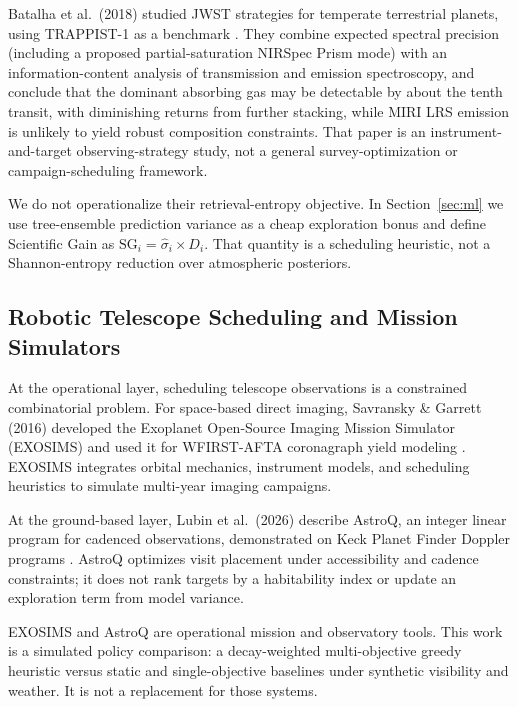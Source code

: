 \documentclass[11pt,a4paper]{article}
\begin{document}
Batalha et al.\ (2018) studied JWST strategies for temperate terrestrial planets, using TRAPPIST-1 as a benchmark \cite{batalha2018}. They combine expected spectral precision (including a proposed partial-saturation NIRSpec Prism mode) with an information-content analysis of transmission and emission spectroscopy, and conclude that the dominant absorbing gas may be detectable by about the tenth transit, with diminishing returns from further stacking, while MIRI LRS emission is unlikely to yield robust composition constraints. That paper is an instrument-and-target observing-strategy study, not a general survey-optimization or campaign-scheduling framework.

We do not operationalize their retrieval-entropy objective. In Section~\ref{sec:ml} we use tree-ensemble prediction variance as a cheap exploration bonus and define Scientific Gain as $\text{SG}_i = \hat{\sigma}_i \times D_i$. That quantity is a scheduling heuristic, not a Shannon-entropy reduction over atmospheric posteriors.

\subsection{Robotic Telescope Scheduling and Mission Simulators}

At the operational layer, scheduling telescope observations is a constrained combinatorial problem. For space-based direct imaging, Savransky \& Garrett (2016) developed the Exoplanet Open-Source Imaging Mission Simulator (EXOSIMS) and used it for WFIRST-AFTA coronagraph yield modeling \cite{savransky2016}. EXOSIMS integrates orbital mechanics, instrument models, and scheduling heuristics to simulate multi-year imaging campaigns.

At the ground-based layer, Lubin et al.\ (2026) describe AstroQ, an integer linear program for cadenced observations, demonstrated on Keck Planet Finder Doppler programs \cite{lubin2026astroq}. AstroQ optimizes visit placement under accessibility and cadence constraints; it does not rank targets by a habitability index or update an exploration term from model variance.

EXOSIMS and AstroQ are operational mission and observatory tools. This work is a simulated policy comparison: a decay-weighted multi-objective greedy heuristic versus static and single-objective baselines under synthetic visibility and weather. It is not a replacement for those systems.

\end{document}

